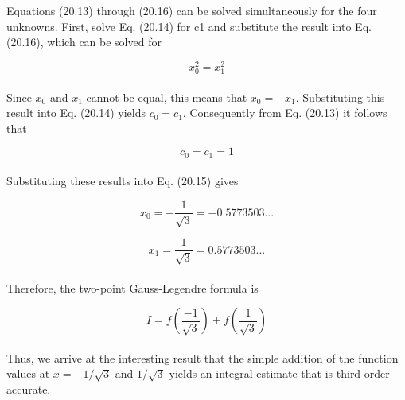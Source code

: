 \documentclass[../main.tex]{subfiles}
\begin{document}
Equations (20.13) through (20.16) can be solved simultaneously for the four unknowns.
First, solve Eq. (20.14) for c1 and substitute the result into Eq. (20.16), which can be solved for

	$$x^{2}_{0} = x^{2}_{1}$$\\
Since $x_0$ and $x_1$ cannot be equal, this means that $x_0 = −x_1$. Substituting this result into
Eq. (20.14) yields $c_0 = c_1$. Consequently from Eq. (20.13) it follows that

	$$c_0 = c_1 = 1$$\\
Substituting these results into Eq. (20.15) gives

	$$x_0 = -\dfrac{1}{\sqrt{3}} = −0.5773503 ...$$
	
	$$x_1 = \dfrac{1}{\sqrt{3}} = 0.5773503 ...$$\\
Therefore, the two-point Gauss-Legendre formula is

\begin{equation}
	\tag{20.17}
	I=f \left(\dfrac{-1}{\sqrt{3}} \right) + f \left(\dfrac{1}{\sqrt{3}} \right)
\end{equation}\\
Thus, we arrive at the interesting result that the simple addition of the function values at $x = −1/\sqrt{3}$ and $1/\sqrt{3}$ yields an integral estimate that is third-order accurate.
\end{document}

